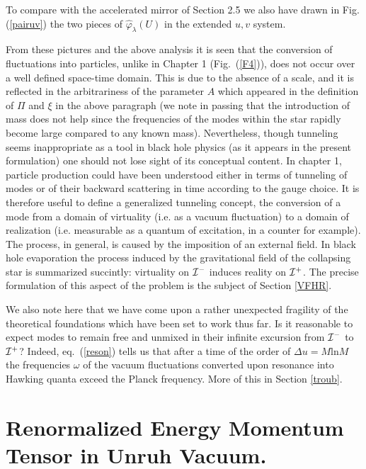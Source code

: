 \documentclass[12pt,oneside]{report}
\def\om{\omega	}
\begin{document}
To compare with the accelerated mirror of Section 2.5 
we also have drawn in Fig.(\ref{pairuv})
the two pieces of $\hat \varphi_\lambda (U)$ in the extended $u,v$ system.
\par From these pictures and the above analysis it is seen that the conversion of
fluctuations into particles, unlike in Chapter 1 (Fig.~(\ref{F4})),
does not occur
over a well defined space-time domain. This 
is due to the absence of a scale, and it is
reflected in the arbitrariness of the parameter $A$ which appeared in the
definition of $\Pi$ and $\xi$ in the above paragraph (we note in passing that
the introduction of mass does not help since the frequencies of the modes
within the star rapidly become large compared to any known mass). Nevertheless,
though tunneling seems inappropriate as a tool in black hole physics (as it
appears in the present formulation) one should not lose sight of its
conceptual content. In chapter 1, particle production could have been
understood either in terms of tunneling of modes or of their backward
scattering in time according to the gauge choice. It is therefore useful to
define a generalized tunneling concept, the conversion of a mode from a domain
of virtuality (i.e. as a vacuum fluctuation) to a domain of realization
(i.e. measurable as a quantum of excitation, in a counter for example). The
process, in general, is caused by the imposition of an external field. In black
hole evaporation the process induced by the gravitational field of the
collapsing star is summarized succintly: virtuality on  ${\cal I}^-$ induces
reality on  ${\cal I}^+$. The precise formulation of this aspect of the problem
is the subject of Section \ref{VFHR}.

We also note here that we have come upon a rather unexpected fragility of the
theoretical foundations which have been set to work thus far. Is it reasonable
to expect modes to remain free and unmixed in their infinite excursion from 
 ${\cal I}^-$ to  ${\cal I}^+$? 
Indeed, eq.~(\ref{reson}) tells us that after a time of the order of $\Delta
u = M \mbox{ln} M$ the frequencies $\om$ of the vacuum fluctuations
converted upon resonance into Hawking quanta  exceed the Planck frequency.
More of this in Section \ref{troub}.

 






\section{Renormalized Energy Momentum Tensor in Unruh Vacuum.}\label{Tmunuren} 
\end{document}
